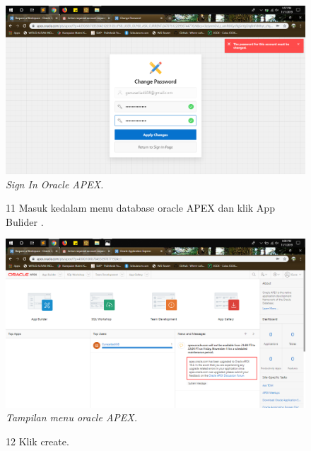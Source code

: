 \begin{enumerate}
\begin{figure}
    \begin{center}
\includegraphics[scale=0.2]{figures/g8.png}
    \caption{\textit{Sign In Oracle APEX.}}
        \end{center}
\label{gambar}
\end{figure}

\begin{figure}
\item[11] Masuk kedalam menu database oracle APEX dan klik App Bulider .

    \begin{center}
\includegraphics[scale=0.2]{figures/g9.png}
    \caption{\textit{Tampilan menu oracle APEX.}}
        \end{center}
\label{gambar}
\end{figure}

\begin{figure}
\item[12] Klik create.


\end{figure}
\end{enumerate}
